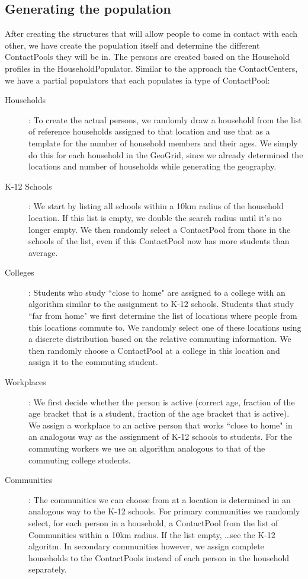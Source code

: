 \subsection{Generating the population}
\label{subsection:genpop}
After creating the structures that will allow people to come in contact with each other, we have create the population itself and determine the different ContactPools they will be in. The persons are created based on the Household profiles in the HouseholdPopulator. Similar to the approach the ContactCenters, we have a partial populators that
each populates ia type of ContactPool:

\begin{description}
    \item[Households]:
        To create the actual persons, we randomly draw a household from the list of reference households assigned to that location
        and use that as a template for the number of household members and their ages.
        We simply do this for each household in the GeoGrid, since we already determined
        the locations and number of households while generating the geography.
    \item[K-12 Schools]:
        We start by listing all schools within a 10km radius of the household location.
        If this list is empty, we double the search radius until it's no longer empty.
        We then randomly select a ContactPool from those in the schools of the list,
       even if this ContactPool now has more students than average.
    \item[Colleges]:
        Students who study ``close to home" are assigned to a college with an algorithm
        similar to the assignment to K-12 schools.
        Students that study ``far from home" we first determine the list of locations
        where people from this locations commute to. We randomly select one of these locations
        using a discrete distribution based on the relative commuting information.
        We then randomly choose a ContactPool at a college in this location and assign it to
        the commuting student.
    \item[Workplaces]:
        We first decide whether the person is active (correct age, fraction of the age bracket that is a student,
        fraction of the age bracket that is active).
        We assign a workplace to an active person that works ``close to home" in an
        analogous way as the assignment of K-12 schools to students.
        For the commuting workers we use an algorithm analogous to that of the commuting college students.
    \item[Communities]:
        The communities we can choose from at a location is determined in an analogous
        way to the K-12 schools.
        For primary communities we randomly select, for each person in a household, a ContactPool
        from the list of Communities within a 10km radius. If the list empty, \ldots see the K-12 algoritm.
        In secondary communities however, we assign complete households to the
        ContactPools instead of each person in the household separately.
\end{description}

